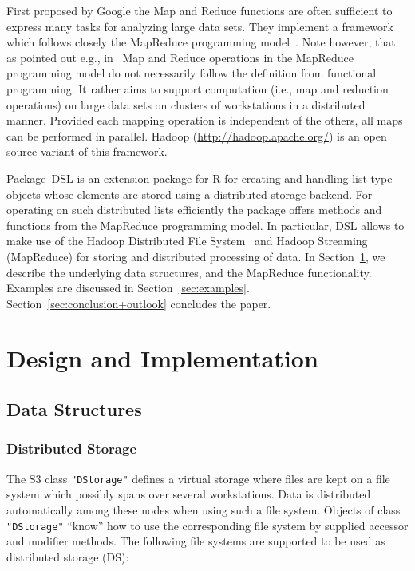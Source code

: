 \documentclass[fleqn]{article}
\newcommand{\pkg}[1]{{\normalfont\fontseries{b}\selectfont #1}}
\let\code=\texttt
\let\proglang=\textsf
\newcommand{\class}[1]{\code{"#1"}}
\begin{document}
First proposed by Google the Map and Reduce functions are often
sufficient to express many tasks for analyzing large data sets. They
implement a framework which follows closely the MapReduce programming
model~\citep[see][and
\url{http://en.wikipedia.org/wiki/MapReduce}]{Dean+Ghemawat:2004}. Note
however, that as pointed out e.g., in~\cite{Laemmel:2007} Map and
Reduce operations in the MapReduce programming model do not
necessarily follow the definition from functional programming.  It
rather aims to support computation (i.e., map and reduction
operations) on large data sets on clusters of workstations in a
distributed manner. Provided each mapping operation is independent of
the others, all maps can be performed in parallel. Hadoop
(\url{http://hadoop.apache.org/}) is an open source variant of this
framework.

Package~\pkg{DSL} is an extension package for \proglang{R} for
creating and handling list-type objects whose elements are stored
using a distributed storage backend. For operating on such distributed
lists efficiently the package offers methods and functions from the
MapReduce programming model. In particular, \pkg{DSL} allows to make
use of the Hadoop Distributed File System~\citep[HDFS,
see][]{Borthakur:2010} and Hadoop Streaming (MapReduce) for storing
and distributed processing of data. In
Section~\ref{sec:design+implementation}, we describe the underlying
data structures, and the MapReduce functionality.  Examples are
discussed in Section~\ref{sec:examples}.
Section~\ref{sec:conclusion+outlook} concludes the paper.


\section{Design and Implementation}
\label{sec:design+implementation}

\subsection{Data Structures}

\subsubsection{Distributed Storage}

The S3 class \class{DStorage} defines a virtual storage where files
are kept on a file system which possibly spans over several
workstations. Data is distributed automatically among these nodes
when using such a file system. Objects of class \class{DStorage}
``know'' how to use the corresponding file system by supplied accessor
and modifier methods. The following file systems are supported to be
used as distributed storage (DS):
\end{document}
